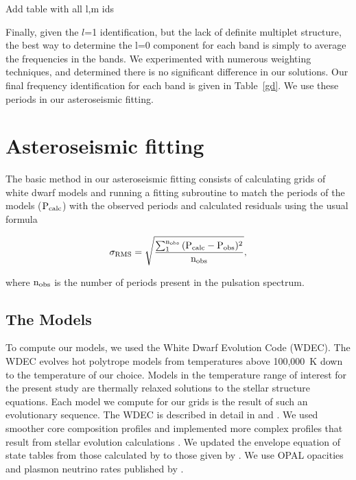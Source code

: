 \documentclass[12pt,preprint]{aastex}
\begin{document}
Add table with all l,m ids

Finally, given the $l$=1 identification, but the lack of definite multiplet structure, the best way to 
determine the l=0 component for each band is simply to average the frequencies in the bands.  We experimented
with numerous weighting techniques, and determined there is no significant difference in our solutions.  
Our final frequency identification for each band is given in Table~\ref{gd}. We use these periods in our asteroseismic fitting. 

\section{Asteroseismic fitting}
\label{fitting}

The basic method in our asteroseismic fitting consists of calculating grids of white dwarf models and 
running a fitting subroutine to match the periods of the models ($\rm P_{calc}$) with the observed 
periods and calculated residuals using the usual formula

\begin{equation}
\label{fiteq1}
\rm \sigma_{RMS} = \sqrt{\frac{\sum_{1}^{n_{obs}} {(P_{calc}-P_{obs})^2}}{n_{obs}}},
\end{equation}

\noindent where $\rm n_{obs}$ is the number of periods present in the pulsation spectrum.

\subsection{The Models}
\label{models}

To compute our models, we used the White Dwarf Evolution Code (WDEC). The WDEC evolves hot 
polytrope models from temperatures above 100{,}000~K down to the temperature of our choice. 
Models in the temperature range of interest for the present study are thermally relaxed 
solutions to the stellar structure equations. Each model we compute for our grids is the result 
of such an evolutionary sequence. The WDEC is described in detail in \citet{Lamb75} and 
\citet{Wood90}. We used smoother core composition profiles and implemented more complex profiles 
that result from stellar evolution calculations \citep{Salaris97}. We updated the envelope 
equation of state tables from those calculated by \citet{Fontaine77} to those given by 
\citet{Saumon95}. We use OPAL opacities \citep{Iglesias96} and plasmon neutrino rates 
published by \citet{Itoh96}. 
\end{document}
